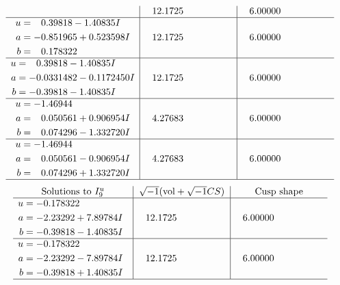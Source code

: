 \documentclass[1p]{elsarticle_modified}
\theoremstyle{definition}
\newcommand{\I}{\sqrt{-1}}
\begin{document}
$$\begin{array}{c|c|c}
 & \phantom{-}12.1725\phantom{ +0.000000I} & \phantom{-}6.00000\phantom{ +0.000000I} \\ \hline\begin{aligned}
u &= \phantom{-}0.39818 - 1.40835 I \\
a &= -0.851965 + 0.523598 I \\
b &= \phantom{-}0.178322\phantom{ +0.000000I}\end{aligned}
 & \phantom{-}12.1725\phantom{ +0.000000I} & \phantom{-}6.00000\phantom{ +0.000000I} \\ \hline\begin{aligned}
u &= \phantom{-}0.39818 - 1.40835 I \\
a &= -0.0331482 - 0.1172450 I \\
b &= -0.39818 - 1.40835 I\end{aligned}
 & \phantom{-}12.1725\phantom{ +0.000000I} & \phantom{-}6.00000\phantom{ +0.000000I} \\ \hline\begin{aligned}
u &= -1.46944\phantom{ +0.000000I} \\
a &= \phantom{-}0.050561 + 0.906954 I \\
b &= \phantom{-}0.074296 - 1.332720 I\end{aligned}
 & \phantom{-}4.27683\phantom{ +0.000000I} & \phantom{-}6.00000\phantom{ +0.000000I} \\ \hline\begin{aligned}
u &= -1.46944\phantom{ +0.000000I} \\
a &= \phantom{-}0.050561 - 0.906954 I \\
b &= \phantom{-}0.074296 + 1.332720 I\end{aligned}
 & \phantom{-}4.27683\phantom{ +0.000000I} & \phantom{-}6.00000\phantom{ +0.000000I}\\
 \hline 
 \end{array}$$\newpage$$\begin{array}{c|c|c}  
\text{Solutions to }I^u_{9}& \I (\text{vol} + \sqrt{-1}CS) & \text{Cusp shape}\\
 \hline 
\begin{aligned}
u &= -0.178322\phantom{ +0.000000I} \\
a &= -2.23292 + 7.89784 I \\
b &= -0.39818 - 1.40835 I\end{aligned}
 & \phantom{-}12.1725\phantom{ +0.000000I} & \phantom{-}6.00000\phantom{ +0.000000I} \\ \hline\begin{aligned}
u &= -0.178322\phantom{ +0.000000I} \\
a &= -2.23292 - 7.89784 I \\
b &= -0.39818 + 1.40835 I\end{aligned}
 & \phantom{-}12.1725\phantom{ +0.000000I} & \phantom{-}6.00000\phantom{ +0.000000I}\\
 \hline 
 \end{array}$$\newpage
\end{document}
